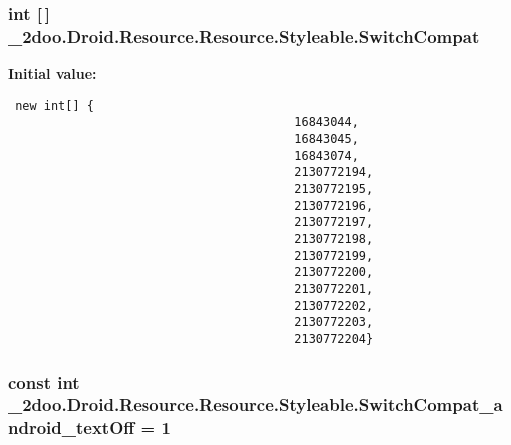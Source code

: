 \hypertarget{class__2doo_1_1_droid_1_1_resource_1_1_styleable_74d2c71c6d6e05a51734526218413e93}{
\subsubsection[{SwitchCompat}]{\setlength{\rightskip}{0pt plus 5cm}int \mbox{[}$\,$\mbox{]} \_\-2doo.Droid.Resource.Resource.Styleable.SwitchCompat}}
\label{class__2doo_1_1_droid_1_1_resource_1_1_styleable_74d2c71c6d6e05a51734526218413e93}


\textbf{Initial value:}

\begin{Code}\begin{verbatim} new int[] {
                                        16843044,
                                        16843045,
                                        16843074,
                                        2130772194,
                                        2130772195,
                                        2130772196,
                                        2130772197,
                                        2130772198,
                                        2130772199,
                                        2130772200,
                                        2130772201,
                                        2130772202,
                                        2130772203,
                                        2130772204}
\end{verbatim}
\end{Code}
\hypertarget{class__2doo_1_1_droid_1_1_resource_1_1_styleable_0c16d883f083a81f8b0004f20105b010}{
\subsubsection[{SwitchCompat\_\-android\_\-textOff}]{\setlength{\rightskip}{0pt plus 5cm}const int \_\-2doo.Droid.Resource.Resource.Styleable.SwitchCompat\_\-android\_\-textOff = 1}}
\label{class__2doo_1_1_droid_1_1_resource_1_1_styleable_0c16d883f083a81f8b0004f20105b010}



